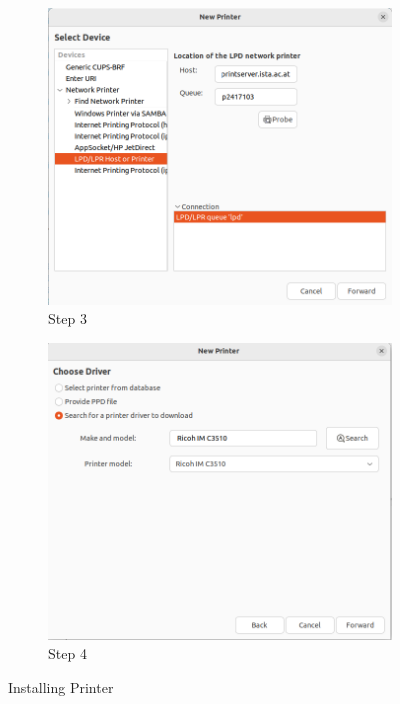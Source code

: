 \documentclass{article}
\begin{document}
\begin{figure}[h!]
    \centering
    \begin{subfigure}{.49\textwidth}
        \centering
        \includegraphics[width=.8\linewidth]{Figures/Printer_1.png}
        \caption{Step 3}
        \label{fig:sub1}
    \end{subfigure}
    \begin{subfigure}{.49\textwidth}
        \centering
        \includegraphics[width=.8\linewidth]{Figures/Printer_2.png}
        \caption{Step 4}
        \label{fig:sub2}
    \end{subfigure}
    \caption{Installing Printer}
    \label{fig:test}
\end{figure}
\end{document}
